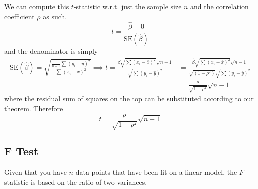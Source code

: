  \begin{theorem}
    \label{thm:t-statistic-from-the-correlation-coefficient}
  We can compute this $t$-statistic w.r.t. just the sample size $n$ and the \hyperref[prob-def:correlation-coefficient]{correlation coefficient} $\rho$ as such. 
  \begin{equation}
    t = \frac{\hat{\beta} - 0}{\mathrm{SE}(\hat{\beta})}
  \end{equation}
  and the denominator is simply 
  \begin{align*}
    \mathrm{SE}(\hat{\beta}) = \sqrt{\frac{\frac{1}{n-1} \sum (y_i - \hat{y})^2}{\sum (x_i - \bar{x})^2}} \implies t = \frac{\hat{\beta} \sqrt{\sum (x_i - \bar{x})^2} \sqrt{n-1}}{\sqrt{\sum (y_i - \hat{y})^2}} & = \frac{\hat{\beta} \sqrt{\sum (x_i - \bar{x})^2} \sqrt{n-1}}{\sqrt{(1 - \rho^2)} \sqrt{\sum (y_i - \bar{y})^2}} \\ & = \frac{\rho}{\sqrt{1 - \rho^2}} \sqrt{n-1}
  \end{align*}
  where the \hyperref[def:residual-sum-of-squares]{residual sum of squares} on the top can be substituted according to our theorem. Therefore 
  \begin{equation}
    t = \frac{\rho}{\sqrt{1 - \rho^2}} \sqrt{n-1}
  \end{equation}
  \end{theorem}

\subsection{F Test}

  Given that you have $n$ data points that have been fit on a linear model, the $F$-statistic is based on the ratio of two variances. 

